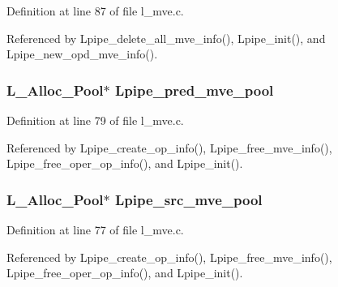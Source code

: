 Definition at line 87 of file l\_\-mve.c.

Referenced by Lpipe\_\-delete\_\-all\_\-mve\_\-info(), Lpipe\_\-init(), and Lpipe\_\-new\_\-opd\_\-mve\_\-info().
\subsubsection{\setlength{\rightskip}{0pt plus 5cm}L\_\-Alloc\_\-Pool$\ast$ \bf{Lpipe\_\-pred\_\-mve\_\-pool}}\label{l__mve_8h_3c5eb3ef3a82d664ba3a3da10b8e0093}




Definition at line 79 of file l\_\-mve.c.

Referenced by Lpipe\_\-create\_\-op\_\-info(), Lpipe\_\-free\_\-mve\_\-info(), Lpipe\_\-free\_\-oper\_\-op\_\-info(), and Lpipe\_\-init().
\subsubsection{\setlength{\rightskip}{0pt plus 5cm}L\_\-Alloc\_\-Pool$\ast$ \bf{Lpipe\_\-src\_\-mve\_\-pool}}\label{l__mve_8h_7f8629ad0a52237fabc7b5b90c9a369c}




Definition at line 77 of file l\_\-mve.c.

Referenced by Lpipe\_\-create\_\-op\_\-info(), Lpipe\_\-free\_\-mve\_\-info(), Lpipe\_\-free\_\-oper\_\-op\_\-info(), and Lpipe\_\-init().